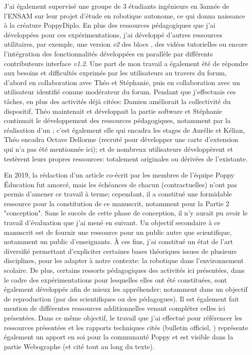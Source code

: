         J'ai également supervisé une groupe de 3 étudiants ingénieurs en 3\ieme année de l'ENSAM sur leur projet d'étude en robotique autonome, ce qui donna naissance à la créature PoppyDiplo.
        En plus des ressources pédagogiques que j'ai développées pour ces expérimentations, j'ai développé d'autres ressources utilitaires, par exemple, une version \textit{v2} des blocs , des vidéos tutorielles ou encore l'intégration des fonctionnalités développées en parallèle par différents contributeurs \ie interface \textit{v1.2}. Une part de mon travail a également été de répondre aux besoins et difficultés exprimés par les utilisateurs au travers du forum, d'abord en collaboration avec Théo et Stéphanie, puis en collaboration avec un utilisateur identifié comme modérateur du forum.
        Pendant que j'effectuais ces tâches, en plus des activités déjà citées: Damien améliorait la collectivité du dispositif, Théo maintenait et développait la partie software et Stéphanie continuait le développement des ressources pédagogiques, notamment par la réalisation d'un ; c'est également elle qui encadra les stages de Aurélie et Kélian, Théo encadra Octave Dellorme (recruté pour développer une carte d'extension qui n'a pas été mentionnée ici); et de nombreux utilisateurs développèrent et testèrent leurs propres ressources: totalement originales ou dérivées de l'existante.\par%
        En 2019, la rédaction d'un article co-écrit par les membres de l'équipe Poppy Éducation fut amorcé, mais les échéances de chacun (\ie contractuelles) n'ont pas permis d'amener ce travail à terme; cependant, il a constitué une formidable ressource pour la constitution de ce manuscrit, notamment pour la Partie 2 "conception".
        Sans le succès de cette phase de conception, il n'y aurait pu avoir le travail d'évaluation que j'ai mené en suivant. Un objectif secondaire à ce manuscrit est de fournir une ressource pour un public autre que scientifique, notamment un public d'enseignants. À ces fins, j'ai constitué un état de l'art diversifié permettant d'expliciter certaines bases théoriques issues de plusieurs disciplines, pour les adapter à notre contexte: la robotique dans l'environnement scolaire. De plus, certains ressorts pédagogiques des activités ici présentées, dans le cadre des expérimentations pour lesquelles elles ont été constituées, sont également développés afin de mieux les appréhender; notamment dans un objectif de reproduction (par des scientifiques ou des pédagogues). Il est également fait mention de différentes ressources additionnelles venant compléter celles ici présentées.
        Dans ce même objectif, le travail que j'ai effectué pour référencer les ressources présentées et les rapports techniques cités (\eg bulletin officiel, \etc) représente également un apport en soi pour la communauté Poppy et est visible dans la partie Webographe (et cité tout au long du texte).